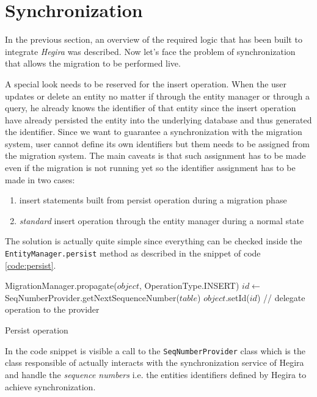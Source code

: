 \section{Synchronization}
\label{sec:synch}
In the previous section, an overview of the required logic that has been built to integrate \textit{Hegira} was described. Now let's face the problem of synchronization that allows the migration to be performed live.

\noindent A special look needs to be reserved for the insert operation. When the user updates or delete an entity no matter if through the entity manager or through a query, he already knows the identifier of that entity since the insert operation have already persisted the entity into the underlying database and thus generated the identifier.
Since we want to guarantee a synchronization with the migration system, user cannot define its own identifiers but them needs to be assigned from the migration system.
The main caveats is that such assignment has to be made even if the migration is not running yet so the identifier assignment has to be made in two cases:
\begin{enumerate}
\item insert statements built from persist operation during a migration phase
\item \textit{standard} insert operation through the entity manager during a normal state
\end{enumerate}

\noindent The solution is actually quite simple since everything can be checked inside the \texttt{EntityManager.persist} method as described in the snippet of code \ref{code:persist}.

\begin{algorithm}[h]
  \begin{algorithmic}[1]
                \State MigrationManager.propagate($object$, OperationType.INSERT)
      \Else
        \State $id \gets$ SeqNumberProvider.getNextSequenceNumber($table$)
        \State $object$.setId($id$)
        \State // delegate operation to the provider
      \EndIf
    \EndProcedure
  \end{algorithmic}	
  \caption{Persist operation}
  \label{code:isMigrating}
\end{algorithm}

\noindent In the code snippet is visible a call to the  \texttt{SeqNumberProvider} class which is the class responsible of actually interacts with the synchronization service of Hegira and handle the \textit{sequence numbers} i.e. the entities identifiers defined by Hegira to achieve synchronization. 

